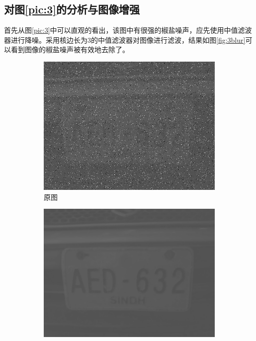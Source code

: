\documentclass[a4paper]{ctexart}
\newcommand{\outwtwo}{0.4\textwidth}
\begin{document}
\begin{spacing}{1.35}
	\subsection{对图\ref{pic:3}的分析与图像增强}
	首先从图\ref{pic:3}中可以直观的看出，该图中有很强的椒盐噪声，应先使用中值滤波器进行降噪。采用核边长为3的中值滤波器对图像进行滤波，结果如图\ref{fig:3blur}可以看到图像的椒盐噪声被有效地去除了。
	\begin{figure}[htbp]
		\centering
		\begin{subfigure}[t]{\outwtwo}
			\centering
			\includegraphics[width=\textwidth]{figure/image3.jpg}
			\caption{原图}
		\end{subfigure}
		\begin{subfigure}[t]{\outwtwo}
			\centering
			\includegraphics[width=\textwidth]{figure/3_img_blur.png}

\end{subfigure}
\end{figure}
\end{spacing}
\end{document}
